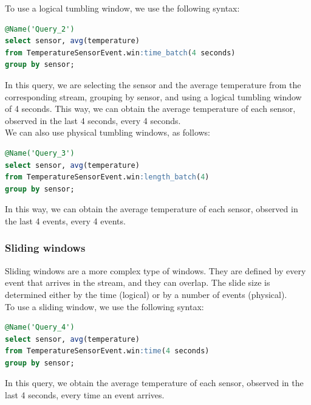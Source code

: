 To use a logical tumbling window, we use the following syntax:\\

\begin{lstlisting}[language=SQL]
@Name('Query_2')
select sensor, avg(temperature)
from TemperatureSensorEvent.win:time_batch(4 seconds)
group by sensor;
\end{lstlisting}

In this query, we are selecting the sensor and the average temperature from the
corresponding stream, grouping by sensor, and using a logical tumbling window of
4 seconds. This way, we can obtain the average temperature of each sensor, observed
in the last 4 seconds, every 4 seconds.\\

We can also use physical tumbling windows, as follows:\\

\begin{lstlisting}[language=SQL]
@Name('Query_3')
select sensor, avg(temperature)
from TemperatureSensorEvent.win:length_batch(4)
group by sensor;
\end{lstlisting}

In this way, we can obtain the average temperature of each sensor, observed in the 
last 4 events, every 4 events.\\

\subsubsection{Sliding windows}

Sliding windows are a more complex type of windows. They are defined by
every event that arrives in the stream, and they can overlap. The slide size
is determined either by the time (logical) or by a number of events (physical).\\

To use a sliding window, we use the following syntax:\\

\begin{lstlisting}[language=SQL]
@Name('Query_4')
select sensor, avg(temperature)
from TemperatureSensorEvent.win:time(4 seconds)
group by sensor;
\end{lstlisting}

In this query, we obtain the average temperature of each sensor, observed
in the last 4 seconds, every time an event arrives.\\

